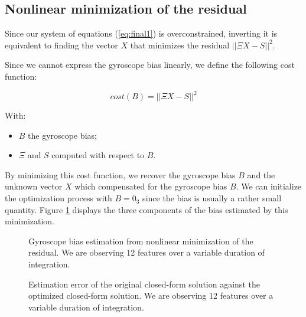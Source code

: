 \documentclass[letterpaper, 10 pt, conference]{ieeeconf}  %
\begin{document}
\subsection{Nonlinear minimization of the residual}

Since our system of equations (\ref{eq:final1}) is overconstrained,
inverting it is equivalent to finding the vector $X$ that minimizes the residual $||\Xi X - S||^2$.

Since we cannot express the gyroscope bias linearly,
we define the following cost function:

\begin{equation}
  \label{eq:cost}
  cost(B) = ||\Xi X - S||^2
\end{equation}

With:
\begin{itemize}
\item $B$ the gyroscope bias;
\item $\Xi$ and $S$ computed with respect to $B$.
\end{itemize}

By minimizing this cost function, we recover the gyroscope bias $B$ and the unknown vector $X$ which compensated for the gyroscope bias $B$.
We can initialize the optimization process with $B = 0_3$ since the bias is usually a rather small quantity. Figure \ref{fig:gBiasEstimate} displays the three components of the bias estimated by this minimization.

\begin{figure}
  \centering
  \resizebox{\columnwidth}{!}{}
  \caption{Gyroscope bias estimation from nonlinear minimization of the residual. We are observing 12 features  over a variable duration of integration. \label{fig:gBiasEstimate}}
\end{figure}

\begin{figure}
   \centering
   \resizebox{\columnwidth}{!}{}
                \caption{Estimation error of the original closed-form solution against the optimized closed-form solution.  We are observing 12 features  over a variable duration of integration. \label{fig:optEstimate}}
\end{figure}
\end{document}
